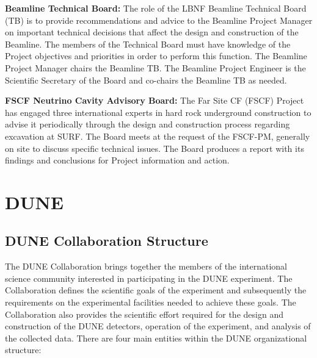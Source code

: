 \textbf{Beamline Technical Board:} The role of the LBNF Beamline Technical Board (TB) is to provide recommendations and advice to the Beamline Project Manager on important technical decisions that affect the design and construction of the Beamline. The members of the Technical Board must have knowledge of the Project objectives and priorities in order to perform this function. The Beamline Project Manager chairs the Beamline TB. The Beamline Project Engineer is the Scientific Secretary of the Board and co-chairs the Beamline TB as needed. 

\textbf{FSCF Neutrino Cavity Advisory Board:} The Far Site CF (FSCF) Project has engaged three international experts in hard rock underground construction to advise it periodically through the design and construction process regarding excavation at SURF. The Board meets at the request of the FSCF-PM, generally on site to discuss specific technical issues. The Board produces a report with its findings and conclusions for Project information and action. 

\section{DUNE}

\subsection{DUNE Collaboration Structure}

The DUNE Collaboration brings together the members of the international science community
interested in participating in the DUNE experiment.  The Collaboration defines the scientific goals of the experiment and subsequently the requirements on the experimental facilities needed to achieve these goals.  The Collaboration also provides the scientific effort required for the design and construction of the DUNE detectors, operation of the experiment, and analysis of the collected data. There are four main entities within the DUNE organizational structure:

